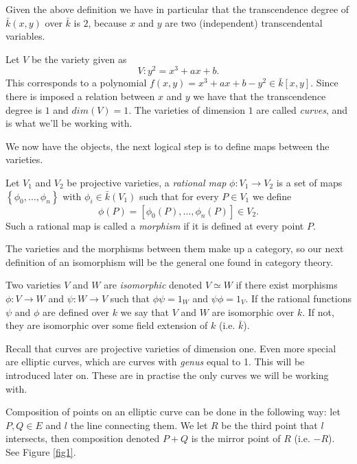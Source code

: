 Given the above definition we have in particular that the transcendence degree of $\bar{k}(x,y)$ over
$\bar{k}$ is $2$, because $x$ and $y$ are two (independent) transcendental variables.

\begin{ex}
 Let $V$ be the variety given as
$$ V: y^2 = x^3 + ax + b. $$
This corresponds to a polynomial $f(x,y) = x^3+ax+b-y^2 \in \bar{k}[x,y]$. Since there
is imposed a relation between $x$ and $y$ we  have that the transcendence degree is $1$ and
$dim(V)=1$. The varieties of dimension $1$ are called \emph{curves}, and is what we'll be working with.
\end{ex}
We now have the objects, the next logical step is to define maps between the varieties.
\begin{mydef}
 Let $V_1$ and $V_2$ be projective varieties, a \emph{rational map} $\phi: V_1 \rightarrow V_2$
is a set of maps $\left\{\phi_0,\ldots,\phi_n\right\}$ with $\phi_i \in \bar{k}(V_1)$ such that for every
$P\in V_1$ we define
$$\phi(P) = [\phi_0(P),\ldots,\phi_n(P)] \in V_2.$$
Such a rational map is called a \emph{morphism} if it is defined at every point $P$.
\end{mydef}

The varieties and the morphisms between them make up a category, so our next
definition of an isomorphism will be the general one found in category theory.

\begin{mydef}
 Two varieties $V$ and $W$ are \emph{isomorphic} denoted $V\simeq W$
if there exist morphisms $\phi: V \rightarrow W$ and $\psi: W \rightarrow V$ such that
$\phi \psi = 1_W$ and $\psi \phi = 1_V$.
If the rational functions $\psi$ and $\phi$ are defined over $k$ we say that $V$ and $W$
are isomorphic over $k$. If not, they are isomorphic over some field extension of $k$
(i.e. $\bar{k}$).
\end{mydef}

Recall that curves are projective varieties of dimension one. Even more special
are elliptic curves, which are curves with \emph{genus} equal to 1. This will
be introduced later on. These are in practise the only curves we will be working with.

Composition of points on an elliptic curve can be done in the following way:
let $P,Q\in E$ and $l$ the line connecting them. We let $R$ be the third
point that $l$ intersects, then composition denoted $P+Q$ is the mirror
point of $R$ (i.e. $-R$). See Figure \ref{fig1}.

